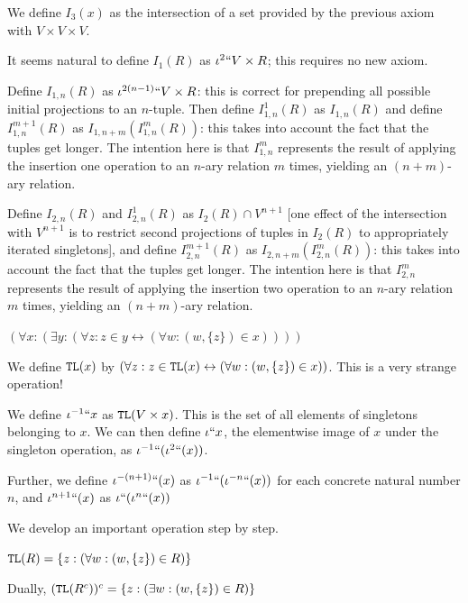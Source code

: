 \documentclass{article}
\theoremstyle{definition}
\theoremstyle{remark}
\begin{document}
{\begin{description}
We define $I_3(x)$ as the intersection of a set provided by the previous axiom with $V \times V \times V$.

\item[definition:]  It seems natural to define $I_1(R)$ as $\iota^2``V \times R$; this requires no new axiom.

\item[definition:]  Define $I_{1,n}(R)$ as $\iota^{2(n-1)}``V \times R$:  this is correct for prepending all possible initial projections
to an $n$-tuple.  Then define $I^1_{1,n}(R)$ as $I_{1,n}(R)$ and define $I^{m+1}_{1,n}(R)$ as $I_{1,n+m}(I^m_{1,n}(R))$:  this takes
into account the fact that the tuples get longer.   The intention here is that $I^m_{1,n}$ represents the result of applying the insertion one operation to an $n$-ary relation $m$ times, yielding an $(n+m)$-ary relation.

Define $I_{2,n}(R)$ and $I^1_{2,n}(R)$ as $I_2(R) \cap V^{n+1}$ [one effect of the intersection with $V^{n+1}$ is to restrict second projections of tuples in $I_2(R)$  to appropriately iterated singletons], and define $I^{m+1}_{2,n}(R)$ as $I_{2
,n+m}(I^m_{2,n}(R))$:   this takes
into account the fact that the tuples get longer.  The intention here is that $I^m_{2,n}$ represents the result of applying the insertion two operation to an $n$-ary relation $m$ times, yielding an $(n+m)$-ary relation.

\item[type lowering axiom:]  $(\forall x:(\exists y:(\forall z:z \in y \leftrightarrow (\forall w:(w,\{z\}) \in x))))$

\item[definition:]
We define ${\tt TL}(x)$ by $(\forall z:z \in {\tt TL}(x) \leftrightarrow (\forall w:(w,\{z\}) \in x))$.  This is a very strange operation!

We define $\iota^{-1}``x$ as ${\tt TL}(V \times x)$.  This is the set of all elements of singletons
belonging to $x$.  We can then define $\iota``x$, the elementwise image of $x$ under the singleton operation, as $\iota^{-1}``(\iota^2``(x))$.

Further, we define $\iota^{-(n+1)}``(x)$ as $\iota^{-1}``(\iota^{-n}``(x))$ for each concrete natural number $n$, and $\iota^{n+1}``(x)$ as $\iota``(\iota^{n}``(x))$

We develop an important operation step by step.

${\tt TL}(R) = \{z:(\forall w:(w,\{z\})\in R)\}$

Dually, $({\tt TL}(R^c))^c = \{z:(\exists w:(w,\{z\})\in R)\}$


\end{description}}
\end{document}
